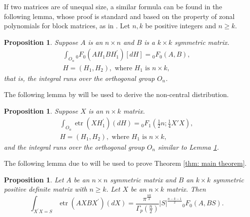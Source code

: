\documentclass{amsart}
\newtheorem{proposition}[theorem]{Proposition}
\theoremstyle{definition}
\numberwithin{equation}{section}
\begin{document}
If two matrices are of unequal size, a similar formula can be found in the following lemma, whose proof is standard and based on the property of zonal polynomials for block matrices, as in \cite{SHIMIZU2021104714}. Let $n,k$ be positive integers and $n\geq k$. 

\begin{proposition}\label{lem: hypergeometric} Suppose $ A$ is an $n\times n$ and $ B$ is a $k\times k$ symmetric matrix. 
    \[\begin{aligned}
        \int_{O_n}{}_{0}F_{0}( A H_1 B H_1^{\prime}) [dH] = {}_{0}F_{0}( A, B),\\ 
         H = (H_{1},  H_{2}), \text{ where }  H_1 \text{ is } n \times k,
    \end{aligned}\]
    that is, the integral runs over the orthogonal group $O_n$.
\end{proposition}

The following lemma by \cite{james1961zonal} will be used to derive the non-central distribution.
\begin{proposition}\label{lem: james55} Suppose $X$ is an $n\times k$ matrix.
    \[\begin{aligned}
        \int_{O_n} \operatorname{etr}( X H_1^{\prime}) (d H) = {}_{0}F_{1}\left(\frac{1}{2}n;\frac{1}{4} X' X\right), \\ 
         H = (H_{1},  H_{2}), \text{ where }  H_1 \text{ is } n \times k,
        \end{aligned}\]
    and the integral runs over the orthogonal group $O_n$ similar to Lemma \ref{lem: hypergeometric}.
\end{proposition}

The following lemma due to \cite{khatri1966} will be used to prove Theorem \ref{thm: main theorem}.
	\begin{proposition} Let $ A$ be an $n \times n$ symmetric matrix and $ B$ an $k \times k$ symmetric positive definite matrix with $n \geq k$. Let $ X$ be an $n \times k$ matrix. Then
		\begin{equation*}
			\int_{ X^{\prime}  X= S} \operatorname{etr} ( A  X  B  X^{\prime}) (d  X)= \frac{\pi^{\frac{nk}{2}}}{\varGamma_{p}(\frac{n}{2} )} | S|^{\frac{n-k-1}{2}} {_0}F_0( A,  B S).\label{eq: Khatri1966}
		\end{equation*}\label{lem: Khatri66}
	\end{proposition}
\end{document}
